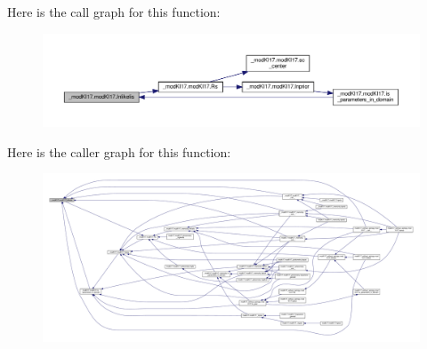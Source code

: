 Here is the call graph for this function\+:\nopagebreak
\begin{figure}[H]
\begin{center}
\leavevmode
\includegraphics[width=350pt]{d8/d2c/class__modKI17_1_1modKI17_a26cef1b72664426d0186a60a27762932_cgraph}
\end{center}
\end{figure}
Here is the caller graph for this function\+:\nopagebreak
\begin{figure}[H]
\begin{center}
\leavevmode
\includegraphics[width=350pt]{d8/d2c/class__modKI17_1_1modKI17_a26cef1b72664426d0186a60a27762932_icgraph}
\end{center}
\end{figure}
\mbox{\label{class__modKI17_1_1modKI17_ab0eed42bfb8b4b20979fc9c72ef028e7}} 
